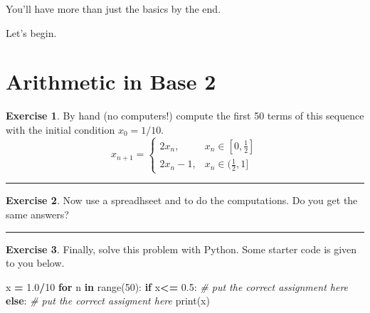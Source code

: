 \documentclass[
]{book}
\newenvironment{Shaded}{\begin{snugshade}}{\end{snugshade}}
\newcommand{\BuiltInTok}[1]{#1}
\newcommand{\CommentTok}[1]{\textcolor[rgb]{0.56,0.35,0.01}{\textit{#1}}}
\newcommand{\ControlFlowTok}[1]{\textcolor[rgb]{0.13,0.29,0.53}{\textbf{#1}}}
\newcommand{\DecValTok}[1]{\textcolor[rgb]{0.00,0.00,0.81}{#1}}
\newcommand{\FloatTok}[1]{\textcolor[rgb]{0.00,0.00,0.81}{#1}}
\newcommand{\KeywordTok}[1]{\textcolor[rgb]{0.13,0.29,0.53}{\textbf{#1}}}
\newcommand{\NormalTok}[1]{#1}
\newcommand{\OperatorTok}[1]{\textcolor[rgb]{0.81,0.36,0.00}{\textbf{#1}}}
\theoremstyle{definition}
\theoremstyle{definition}
\theoremstyle{definition}
\newtheorem{exercise}{Exercise}[chapter]
\theoremstyle{remark}
\begin{document}
You'll have more than just the basics by the end.

Let's begin.

\hypertarget{arithmetic-in-base-2}{%
\section{Arithmetic in Base 2}\label{arithmetic-in-base-2}}

\begin{exercise}
\protect\hypertarget{exr:fail}{}{\label{exr:fail} }By hand (no computers!) compute the first 50
terms of this sequence with the initial condition \(x_0 = 1/10\).
\[x_{n+1} = \left\{ \begin{array}{ll} 2x_n, & x_n \in [0,\frac{1}{2}] \\ 2x_n - 1, & x_n \in (\frac{1}{2},1] \end{array} \right.\]
\end{exercise}

\begin{center}\rule{0.5\linewidth}{0.5pt}\end{center}

\begin{exercise}
\protect\hypertarget{exr:unnamed-chunk-3}{}{\label{exr:unnamed-chunk-3} }Now use a spreadhseet and to do the computations. Do
you get the same answers?
\end{exercise}

\begin{center}\rule{0.5\linewidth}{0.5pt}\end{center}

\begin{exercise}
\protect\hypertarget{exr:unnamed-chunk-4}{}{\label{exr:unnamed-chunk-4} }Finally, solve this problem with Python. Some starter code is given to you below.
\end{exercise}

\begin{Shaded}
\begin{Highlighting}[]
\NormalTok{x }\OperatorTok{=} \FloatTok{1.0}\OperatorTok{/}\DecValTok{10}
\ControlFlowTok{for}\NormalTok{ n }\KeywordTok{in} \BuiltInTok{range}\NormalTok{(}\DecValTok{50}\NormalTok{):}
    \ControlFlowTok{if}\NormalTok{ x}\OperatorTok{\textless{}=} \FloatTok{0.5}\NormalTok{:}
        \CommentTok{\# put the correct assignment here}
    \ControlFlowTok{else}\NormalTok{:}
        \CommentTok{\# put the correct assigment here}
    \BuiltInTok{print}\NormalTok{(x)}
\end{Highlighting}
\end{Shaded}
\end{document}
